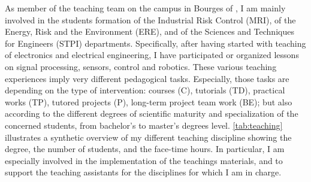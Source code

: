 As member of the teaching team on the campus in Bourges of \INSA \CVL, I am mainly involved in the students formation of the Industrial Risk Control (MRI), of the  Energy, Risk and the Environment (ERE), and of the  Sciences and Techniques for Engineers (STPI) departments. 
Specifically, after having started with teaching of  electronics and electrical engineering, I have participated or organized lessons on  signal processing, sensors, control and robotics.
%
These various teaching experiences imply very different pedagogical tasks.
Especially, those tasks are depending on the type of intervention: courses (C), tutorials (TD), practical works (TP), tutored projects (P), long-term project team work (BE); but also according to the different degrees of scientific maturity and specialization of the concerned students, \ie  from bachelor's to master's degrees level.
\autoref{tab:teaching} illustrates a synthetic overview of my different teaching discipline showing the degree, the number of students, and the face-time hours.
In particular, I am especially involved in the implementation of the teachings materials, and to support the teaching assistants for the disciplines for which I am in charge.
%
